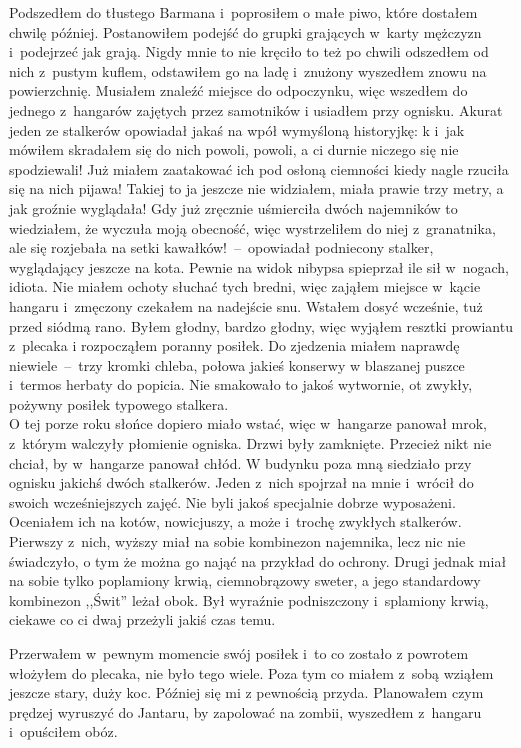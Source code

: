 \documentclass[../MAIN.tex]{subfiles}
\begin{document}
Podszedłem do tłustego Barmana i~poprosiłem o małe piwo, które
dostałem chwilę później. Postanowiłem podejść do grupki
grających w~karty mężczyzn i~podejrzeć jak grają. Nigdy mnie to
nie kręciło to też po chwili odszedłem od nich z~pustym kuflem,
odstawiłem go na ladę i~znużony wyszedłem znowu na
powierzchnię. Musiałem znaleźć miejsce do odpoczynku, więc
wszedłem do jednego z~hangarów zajętych przez samotników i
usiadłem przy ognisku. Akurat jeden ze stalkerów opowiadał
jakaś na wpół wymyśloną historyjkę:
\sd
\xx \3k i~jak mówiłem skradałem się do nich powoli, powoli, a
ci
durnie niczego się nie spodziewali! Już miałem zaatakować ich
pod osłoną ciemności kiedy nagle rzuciła się na nich pijawa!
Takiej to ja jeszcze nie widziałem, miała prawie trzy metry, a
jak groźnie wyglądała! Gdy już zręcznie uśmierciła dwóch
najemników to wiedziałem, że wyczuła moją obecność, więc
wystrzeliłem do niej z~granatnika, ale się rozjebała na setki
kawałków!~--~opowiadał podniecony stalker, wyglądający jeszcze
na
kota.
\qd
Pewnie na widok nibypsa spieprzał ile sił w~nogach,
idiota. Nie miałem ochoty słuchać tych bredni, więc zająłem
miejsce w~kącie hangaru i~zmęczony czekałem na nadejście snu.
%
%
Wstałem dosyć wcześnie, tuż przed siódmą rano. Byłem głodny,
bardzo głodny, więc wyjąłem resztki prowiantu z~plecaka i
rozpocząłem poranny posiłek. Do zjedzenia miałem naprawdę
niewiele~--~trzy kromki chleba, połowa jakieś konserwy w
blaszanej puszce i~termos herbaty do popicia. Nie smakowało to
jakoś wytwornie, ot zwykły, pożywny posiłek typowego stalkera.
\\
O tej porze roku słońce dopiero miało wstać, więc w~hangarze
panował mrok, z~którym walczyły płomienie ogniska. Drzwi były
zamknięte. Przecież nikt nie chciał, by w~hangarze panował
chłód. W budynku poza mną siedziało przy ognisku jakichś dwóch
stalkerów. Jeden z~nich spojrzał na mnie i~wrócił do swoich
wcześniejszych zajęć. Nie byli jakoś specjalnie dobrze
wyposażeni. Oceniałem ich na kotów, nowicjuszy, a może i~trochę
zwykłych stalkerów. Pierwszy z~nich, wyższy miał na sobie
kombinezon najemnika, lecz nic nie świadczyło, o tym że można
go nająć na przykład do ochrony. Drugi jednak miał na sobie
tylko poplamiony krwią, ciemnobrązowy sweter, a jego
standardowy kombinezon ,,Świt'' leżał obok. Był wyraźnie
podniszczony i~splamiony krwią, ciekawe co ci dwaj przeżyli
jakiś czas temu.

Przerwałem w~pewnym momencie swój posiłek i~to co zostało z
powrotem włożyłem do plecaka, nie było tego wiele. Poza tym co
miałem z~sobą wziąłem jeszcze stary, duży koc. Później się mi z
pewnością przyda. Planowałem czym prędzej wyruszyć do Jantaru,
by zapolować na zombii, wyszedłem z~hangaru i~opuściłem obóz.
\end{document}
